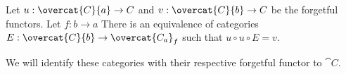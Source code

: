 \begin{lemma}
Let $u: \overcat{C}{a}\rightarrow C$ and
$v: \overcat{C}{b} \rightarrow C$ be the forgetful functors.
Let $f:b\rightarrow a$
There is an equivalence of categories $E:\overcat{C}{b} \rightarrow \overcat{C_a}_f$
such that $u\circ u \circ E = v$.
\end{lemma}

\begin{remark}
We will identify these categories with their respective forgetful functor to $\cat{C}$.
\end{remark}